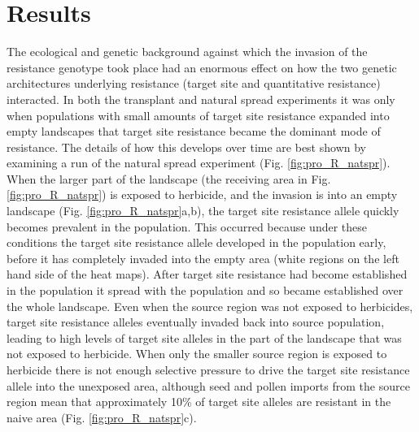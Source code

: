\documentclass[10pt,letterpaper]{article}
\begin{document}
\section*{Results}
The ecological and genetic background against which the invasion of the resistance genotype took place had an enormous effect on how the two genetic architectures underlying resistance (target site and quantitative resistance) interacted. In both the transplant and natural spread experiments it was only when populations with small amounts of target site resistance expanded into empty landscapes that target site resistance became the dominant mode of resistance. The details of how this develops over time are best shown by examining a run of the natural spread experiment (Fig. \ref{fig:pro_R_natspr}).    When the larger part of the landscape (the receiving area in Fig. \ref{fig:pro_R_natspr}) is exposed to herbicide, and the invasion is into an empty landscape (Fig. \ref{fig:pro_R_natspr}a,b), the target site resistance allele quickly becomes prevalent in the population. This occurred because under these conditions the target site resistance allele developed in the population early, before it has completely invaded into the empty area (white regions on the left hand side of the heat maps). After target site resistance had become established in the population it spread with the population and so became established over the whole landscape. Even when the source region was not exposed to herbicides, target site resistance alleles eventually invaded back into source population, leading to high levels of target site alleles in the part of the landscape that was not exposed to herbicide. When only the smaller source region is exposed to herbicide there is not enough selective pressure to drive the target site resistance allele into the unexposed area, although seed and pollen imports from the source region mean that approximately 10\% of target site alleles are resistant in the naive area (Fig. \ref{fig:pro_R_natspr}c).            
\end{document}
